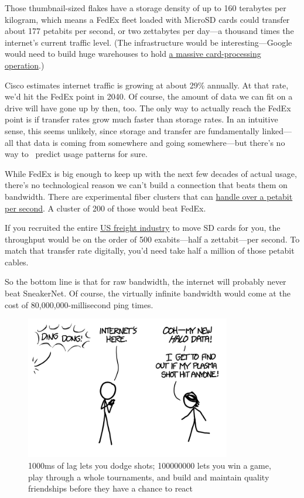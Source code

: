 {Those thumbnail-sized flakes have a storage density of up to 160 terabytes per kilogram, which means a FedEx fleet loaded with MicroSD cards could transfer about 177 petabits per second, or two zettabytes per day—a thousand times the internet’s current traffic level. (The infrastructure would be interesting—Google would need to build huge warehouses to hold \href{http://nuclearsecrecy.com/blog/2011/11/10/weekly-document-01/}{a massive card-processing operation}.)}

{Cisco estimates internet traffic is growing at about 29\% annually. At that rate, we’d hit the FedEx point in 2040. Of course, the amount of data we can fit on a drive will have gone up by then, too. The only way to actually reach the FedEx point is if transfer rates grow much faster than storage rates. In an intuitive sense, this seems unlikely, since storage and transfer are fundamentally linked—all that data is coming from somewhere and going somewhere—but there’s no way to  predict usage patterns for sure.}

{While FedEx is big enough to keep up with the next few decades of actual usage, there’s no technological reason we can’t build a connection that beats them on bandwidth. There are experimental fiber clusters that can \href{http://optics.org/news/4/1/29}{handle over a petabit per second}. A cluster of 200 of those would beat FedEx.}

{If you recruited the entire \href{http://www.cargotransporters.com/pdf/dyk201001.pdf}{US freight industry} to move SD cards for you, the throughput would be on the order of 500 exabits—half a zettabit—per second. To match that transfer rate digitally, you’d need take half a million of those petabit cables.}

{So the bottom line is that for raw bandwidth, the internet will probably never beat SneakerNet. Of course, the virtually infinite bandwidth would come at the cost of 80,000,000-millisecond ping times.}

\begin{figure}[!htbp]
\centering
\includegraphics[scale=0.5, max width=0.8\textwidth]{imgs/a/31/fedex_delivery.png}
\caption{1000ms of lag lets you dodge shots; 100000000 lets you win a game, play through a whole tournaments, and build and maintain quality friendships before they have a chance to react}
\end{figure}


